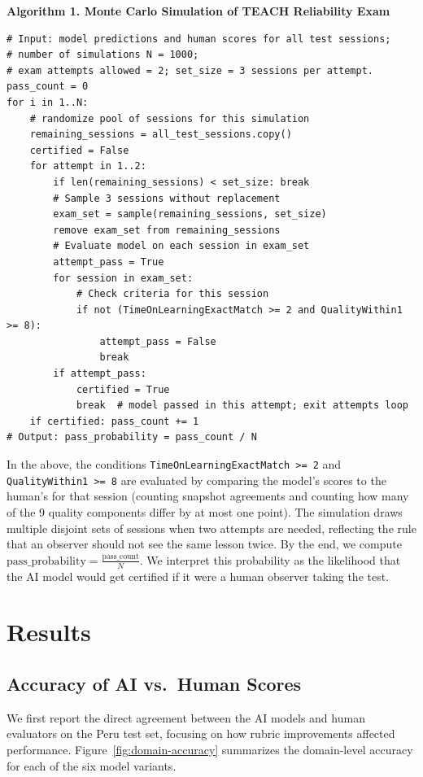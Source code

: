 \documentclass[12pt]{article}
\begin{document}
\vspace{1ex}
\noindent \textbf{Algorithm 1. Monte Carlo Simulation of TEACH Reliability Exam}
\begin{lstlisting}[basicstyle=\small\ttfamily]
# Input: model predictions and human scores for all test sessions;
# number of simulations N = 1000;
# exam attempts allowed = 2; set_size = 3 sessions per attempt.
pass_count = 0
for i in 1..N:
    # randomize pool of sessions for this simulation
    remaining_sessions = all_test_sessions.copy()
    certified = False
    for attempt in 1..2:
        if len(remaining_sessions) < set_size: break
        # Sample 3 sessions without replacement
        exam_set = sample(remaining_sessions, set_size)
        remove exam_set from remaining_sessions
        # Evaluate model on each session in exam_set
        attempt_pass = True
        for session in exam_set:
            # Check criteria for this session
            if not (TimeOnLearningExactMatch >= 2 and QualityWithin1 >= 8):
                attempt_pass = False
                break
        if attempt_pass:
            certified = True
            break  # model passed in this attempt; exit attempts loop
    if certified: pass_count += 1
# Output: pass_probability = pass_count / N
\end{lstlisting}

In the above, the conditions \texttt{TimeOnLearningExactMatch >= 2} and \texttt{QualityWithin1 >= 8} are evaluated by comparing the model’s scores to the human’s for that session (counting snapshot agreements and counting how many of the 9 quality components differ by at most one point). The simulation draws multiple disjoint sets of sessions when two attempts are needed, reflecting the rule that an observer should not see the same lesson twice. By the end, we compute \(\text{pass\_probability} = \tfrac{\text{pass\_count}}{N}\). We interpret this probability as the likelihood that the AI model would get certified if it were a human observer taking the test.

\section{Results}
\label{sec:results}
\subsection{Accuracy of AI vs.\ Human Scores}
\noindent We first report the direct agreement between the AI models and human evaluators on the Peru test set, focusing on how rubric improvements affected performance. Figure~\ref{fig:domain-accuracy} summarizes the domain-level accuracy for each of the six model variants.
\end{document}
